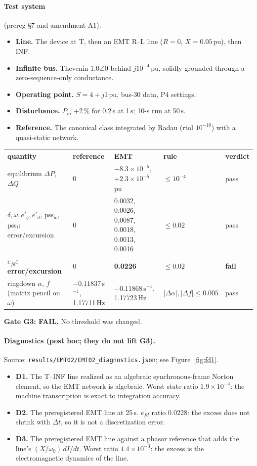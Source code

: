 \documentclass[10pt,a4paper]{article}
\newcommand{\us}{\,\textmu s}
\newcommand{\sinv}{\,s$^{-1}$}
\newcommand{\f}[1]{\nolinkurl{#1}}
\begin{document}
\paragraph{Test system} (prereg \S7 and amendment A1).
\begin{itemize}
\item \textbf{Line.} The device at T, then an EMT R--L line ($R=0$,
  $X=0.05$\,pu), then INF.
\item \textbf{Infinite bus.} Thevenin $1.0\angle0$ behind $j10^{-4}$\,pu,
  solidly grounded through a zero-sequence-only conductance.
\item \textbf{Operating point.} $S=4+j1$\,pu, bus-30 data, P4 settings.
\item \textbf{Disturbance.} $P_m$ +2\,\% for 0.2\,s at 1\,s; 10-s run at
  50\us.
\item \textbf{Reference.} The canonical class integrated by Radau
  (rtol $10^{-10}$) with a quasi-static network.
\end{itemize}

\medskip
\noindent\begin{tabularx}{\linewidth}{@{}L{4.9cm}L{2.5cm}YL{2.1cm}l@{}}
\toprule
quantity & reference & EMT & rule & verdict\\
\midrule
equilibrium $\Delta P$, $\Delta Q$ & 0 & $-8.3\times10^{-5}$, $+2.3\times10^{-5}$\,pu & $\le10^{-4}$ & pass\\
$\delta,\omega,e'_q,e'_d$, pss$_w$, pss$_l$: error/excursion & 0 & 0.0032, 0.0026, 0.0087, 0.0018, 0.0013, 0.0016 & $\le0.02$ & pass\\
\textbf{$e_{fd}$: error/excursion} & 0 & \textbf{0.0226} & $\le0.02$ & \textbf{fail}\\
ringdown $\alpha$, $f$ (matrix pencil on $\omega$) & $-0.11837$\sinv, 1.17711\,Hz & $-0.11868$\sinv, 1.17723\,Hz & $|\Delta\alpha|,|\Delta f|\le0.005$ & pass\\
\bottomrule
\end{tabularx}

\medskip
\noindent\textbf{Gate G3: FAIL.} No threshold was changed.

\paragraph{Diagnostics (post hoc; they do not lift G3).} Source:
\f{results/EMT02/EMT02_diagnostics.json}; see Figure~\ref{fig:fd1}.
\begin{itemize}
\item \textbf{D1.} The T--INF line realized as an algebraic synchronous-frame
  Norton element, so the EMT network is algebraic. Worst state ratio
  $1.9\times10^{-4}$: the machine transcription is exact to integration
  accuracy.
\item \textbf{D2.} The preregistered EMT line at 25\us. $e_{fd}$ ratio 0.0228:
  the excess does not shrink with $\Delta t$, so it is not a discretization
  error.
\item \textbf{D3.} The preregistered EMT line against a phasor reference that
  adds the line's $(X/\omega_0)\,dI/dt$. Worst ratio $1.4\times10^{-3}$: the
  excess is the electromagnetic dynamics of the line.
\end{itemize}
\end{document}
